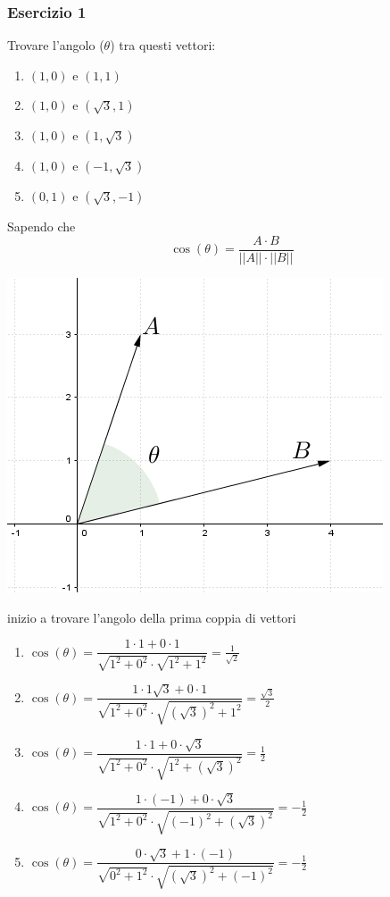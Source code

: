 \documentclass[italian]{article}
\begin{document}
\subsubsection{Esercizio 1} Trovare l'angolo ($\theta$) tra questi vettori:
\begin{enumerate}[label=\alph*.]
	\item $(1,0)$ e $(1,1)$
	\item $(1,0)$ e $(\sqrt{3},1)$
	\item $(1,0)$ e $(1,\sqrt{3})$
	\item $(1,0)$ e $(-1,\sqrt{3})$
	\item $(0,1)$ e $(\sqrt{3},-1)$
\end{enumerate}
Sapendo che 
\[
	\cos (\theta) = \dfrac{A\cdot B}{||A||\cdot ||B||}
\]
\begin{center}
	\includegraphics[width=0.4\linewidth]{img/vettori_angolo_theta.png}
\end{center}

inizio a trovare l'angolo della prima coppia di vettori
\begin{enumerate}[label=\alph*.]
	\item $\cos (\theta) = \dfrac{1\cdot 1 + 0\cdot 1}{\sqrt{1^2+0^2}\cdot \sqrt{1^2+1^2}} = \frac{1}{\sqrt{2}}$
	\item $\cos (\theta) = \dfrac{1\cdot 1\sqrt{3}+ 0\cdot 1}{\sqrt{1^2+0^2}\cdot \sqrt{(\sqrt{3})^2+1^2}} = \frac{\sqrt{3}}{2}$
	\item $\cos (\theta) = \dfrac{1\cdot 1 + 0\cdot \sqrt{3}}{\sqrt{1^2+0^2}\cdot \sqrt{1^2+(\sqrt{3})^2}} = \frac{1}{2}$
	\item $\cos (\theta) = \dfrac{1\cdot (-1) + 0\cdot \sqrt{3}}{\sqrt{1^2+0^2}\cdot \sqrt{(-1)^2+(\sqrt{3})^2}} = -\frac{1}{2}$
	\item $\cos (\theta) = \dfrac{0\cdot \sqrt{3} + 1\cdot (-1)}{\sqrt{0^2+1^2}\cdot \sqrt{(\sqrt{3})^2+(-1)^2}} = -\frac{1}{2}$
\end{enumerate}
\pagebreak
\end{document}
